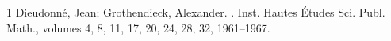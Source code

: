 \begin{thebibliography}{1}
Dieudonn\'{e}, Jean; Grothendieck, Alexander.
.
\newblock Inst. Hautes \'{E}tudes Sci. Publ. Math., volumes 4, 8, 11, 17, 20, 24, 28, 32, 1961--1967.
\end{thebibliography}

